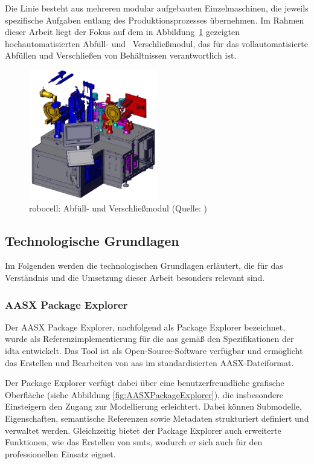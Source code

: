 Die Linie besteht aus mehreren modular aufgebauten Einzelmaschinen, die jeweils spezifische Aufgaben entlang des Produktionsprozesses übernehmen. 
Im Rahmen dieser Arbeit liegt der Fokus auf dem in Abbildung~\ref{fig:robocell} gezeigten hochautomatisierten Abfüll- und%
\pagebreak
~Verschließmodul, das für das vollautomatisierte Abfüllen und Verschließen von Behältnissen verantwortlich ist.

\begin{figure}[htbp]
    \centering
    \includegraphics[width=0.5\textwidth]{Bilder/robocell/filling_closing_module.png}
    \caption[robocell: Abfüll- und Verschließmodul]{robocell: Abfüll- und Verschließmodul (Quelle: \cite{RobocellBetriebsanleitung})}
    \label{fig:robocell}
\end{figure}

\vspace{-0.25em}
\subsection{Technologische Grundlagen}
Im Folgenden werden die technologischen Grundlagen erläutert, die für das Verständnis und die Umsetzung dieser Arbeit besonders relevant sind.
\subsubsection{AASX Package Explorer}
Der AASX Package Explorer, nachfolgend als Package Explorer bezeichnet, wurde als Referenzimplementierung für die \acs{aas} gemäß den Spezifikationen der \acs{idta} entwickelt.
Das Tool ist als Open-Source-Software \cite{AASXPackageExplorer} verfügbar und ermöglicht das Erstellen und Bearbeiten von \acs{aas} im standardisierten AASX-Dateiformat.

Der Package Explorer verfügt dabei über eine benutzerfreundliche grafische Oberfläche (siehe Abbildung \ref{fig:AASXPackageExplorer}), die insbesondere Einsteigern den Zugang zur Modellierung erleichtert.
Dabei können Submodelle, Eigenschaften, semantische Referenzen sowie Metadaten strukturiert definiert und verwaltet werden.
Gleichzeitig bietet der Package Explorer auch erweiterte Funktionen, wie das Erstellen von \acsp{smt}, wodurch er sich auch für den professionellen Einsatz eignet.

